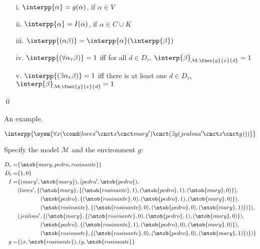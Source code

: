 \documentclass[11pt,a4paper]{article}
\begin{document}
\begin{udefinition}[Semantics of $L$]\label{Lsem}
\begin{itemize}
\item[]
\item[i.] $\interpp{\alpha} = g(\alpha)$, if $\alpha \in V$
\item[ii.] $\interpp{\alpha} = I(\alpha)$, if $\alpha \in C \cup K$
\item[iii.] $\interpp{(\alpha\beta)} = \interpp{\alpha}(\interpp{\beta})$
\item[iv.]$\interpp{(\forall \alpha_{\tau} \beta)} = 1$ iff for all $d \in D_{\tau}$, $\interp{\beta}_{\mathcal{M},\fnex{g}{x}{d}} = 1$ 
\item[v.] $\interpp{(\exists \alpha_{\tau} \beta)} = 1$ iff there is at least one $d \in D_{\tau}$, $\interp{\beta}_{\mathcal{M},\fnex{g}{x}{d}} = 1$ 
\end{itemize}

\qed
\end{udefinition}

An example. 

$$
\interpp{\sysm{\forall x (\cond (loves'\cnct x\cnct mary')\cnct (\exists y (jealous'\cnct x\cnct y)))}}
$$

Specify the model $\mathcal{M}$ and the environment $g$:

\begin{align*}
D_e  = & \{\mtob{mary,pedro,rosinante}\} \\
D_t  = & \{1,0\}\\
I    = & \{(mary',\mtob{mary}), (pedro',\mtob{pedro}),\\
       & (loves',\{(\mtob{mary},\{(\mtob{rosinante}, 1), (\mtob{pedro}, 1), (\mtob{mary}, 0)\}),\\
	   & \quad\quad\quad\quad (\mtob{pedro}, \{(\mtob{rosinante}, 0), (\mtob{pedro}, 1), (\mtob{mary}, 0)\}), \\
	   & \quad\quad\quad\quad (\mtob{rosinante}, \{(\mtob{rosinante}, 0), (\mtob{pedro}, 0), (\mtob{mary}, 1)\})\}), \\
       & (jealous',\{(\mtob{mary},\{(\mtob{rosinante}, 0), (\mtob{pedro}, 1), (\mtob{mary}, 0)\}),\\
	   & \quad\quad\quad\quad (\mtob{pedro}, \{(\mtob{rosinante}, 1), (\mtob{pedro}, 0), (\mtob{mary}, 0)\}), \\
	   & \quad\quad\quad\quad (\mtob{rosinante}, \{(\mtob{rosinante}, 0), (\mtob{pedro}, 0), (\mtob{mary}, 1)\})\})\}\\
g	 = & \{(x,\mtob{rosinante}),(y,\mtob{rosinante}\}
\end{align*}
\end{document}
